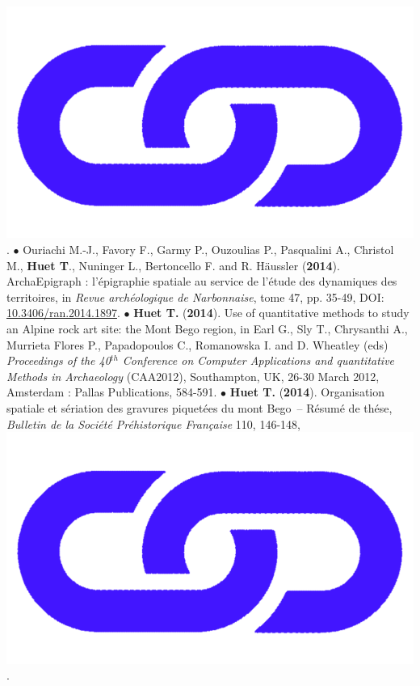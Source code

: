 \documentclass{article}
\begin{document}
\href{https://www.researchgate.net/publication/347437308_Methodes_informatiques_pour_l'etude_des_gravures_rupestres_les_exemples_du_Valcamonica_Italie_et_du_mont_Bego_France}{\includegraphics[scale=0.02]{link_darkblue.png}}.
\smallbreak
$\bullet$ Ouriachi M.-J., Favory F., Garmy P., Ouzoulias P., Pasqualini A., Christol M., \textbf{Huet T}., Nuninger L., Bertoncello F. and R. H\"{a}ussler (\textbf{2014}). ArchaEpigraph : l'\'{e}pigraphie spatiale au service de l'\'{e}tude des dynamiques des territoires, in \textit{Revue arch\'{e}ologique de Narbonnaise}, tome 47, pp. 35-49, DOI: \href{https://doi.org/10.3406/ran.2014.1897}{10.3406/ran.2014.1897}.
\smallbreak
$\bullet$ \textbf{Huet T.} (\textbf{2014}). Use of quantitative methods to study an Alpine rock art site: the Mont Bego region, in Earl G., Sly T., Chrysanthi A., Murrieta Flores P., Papadopoulos C., Romanowska I. and D. Wheatley (eds) \textit{Proceedings of the 40${}^{th}$ Conference on Computer Applications and quantitative Methods in Archaeology} (CAA2012), Southampton, UK, 26-30 March 2012, Amsterdam : Pallas Publications, 584-591.
\smallbreak
$\bullet$ \textbf{Huet T.} (\textbf{2014}). Organisation spatiale et s\'{e}riation des gravures piquet\'{e}es du mont Bego~-- R\'{e}sum\'{e} de th\'{e}se, \textit{Bulletin de la Soci\'{e}t\'{e} Pr\'{e}historique Fran\c{c}aise} 110, 146-148, \href{https://www.persee.fr/doc/bspf_0249-7638_2013_num_110_1_14242}{\includegraphics[scale=0.02]{link_darkblue.png}}.
\end{document}
